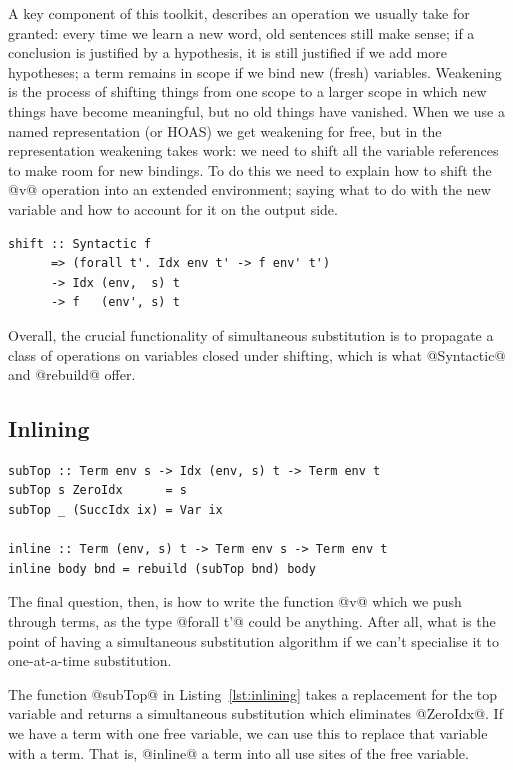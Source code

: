 A key component of this toolkit,  describes an operation we
usually take for granted: every time we learn a new word, old sentences still
make sense; if a conclusion is justified by a hypothesis, it is still justified
if we add more hypotheses; a term remains in scope if we bind new (fresh)
variables. Weakening is the process of shifting things from one scope to a
larger scope in which new things have become meaningful, but no old things have
vanished. When we use a named representation (or HOAS\HOAS{}) we get weakening
for free, but in the  representation weakening takes
work: we need to shift all the variable references to make room for new
bindings. To do this we need to explain how to shift the @v@ operation into
an extended environment; saying what to do with the new variable and how to
account for it on the output side.
%
\begin{lstlisting}[style=haskell]
shift :: Syntactic f
      => (forall t'. Idx env t' -> f env' t')
      -> Idx (env,  s) t
      -> f   (env', s) t
\end{lstlisting}
%
Overall, the crucial functionality of simultaneous substitution is to propagate
a class of operations on variables closed under shifting, which is what
@Syntactic@ and @rebuild@ offer.


\subsection{Inlining}
\label{sec:inlining}

\begin{lstlisting}[style=haskell_float
    ,label=lst:inlining
    ,caption={A simultaneous substitution to inline terms}]
subTop :: Term env s -> Idx (env, s) t -> Term env t
subTop s ZeroIdx      = s
subTop _ (SuccIdx ix) = Var ix

inline :: Term (env, s) t -> Term env s -> Term env t
inline body bnd = rebuild (subTop bnd) body
\end{lstlisting}

The final question, then, is how to write the function @v@ which we push
through terms, as the type @forall t'@ could be anything. After all, what
is the point of having a simultaneous substitution algorithm if we can't
specialise it to one-at-a-time substitution.

The function @subTop@ in Listing~\ref{lst:inlining} takes a replacement for the
top variable and returns a simultaneous substitution which eliminates @ZeroIdx@.
If we have a term with one free variable, we can use this to replace that
variable with a term. That is, @inline@ a term into all use sites of the free
variable.

